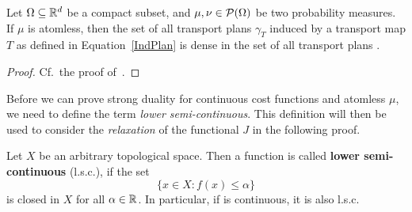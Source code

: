	


\begin{theorem}\label{IndPlansDense}
	Let $\Omega \subseteq \mathbb{R}^d$ be a compact subset, and $\mu, \nu \in \mathcal{P}(\Omega)$ be two probability measures. If $\mu$ is atomless, then the set of all transport plans $\gamma_T$ induced by a transport map $T$ as defined in Equation~\ref{IndPlan} is dense in the set of all transport plans \TP{\mu}{\nu}.
\end{theorem}

\begin{proof}
	Cf.~the proof of\ \cite[Theorem~1.32]{San2015}.
\end{proof}

Before we can prove strong duality for continuous cost functions and atomless $\mu$, we need to define the term \textit{lower semi-continuous}. This definition will then be used to consider the \textit{relaxation} of the functional $J$ in the following proof.

\begin{definition}\label{lsc}
	Let $X$ be an arbitrary topological space. Then a function  is called \textbf{lower semi-continuous} (l.s.c.), if the set
	\[ \big\{ x \in X : f(x) \le \alpha \big\} \]
	is closed in $X$ for all $\alpha \in \mathbb{R}$. In particular, if  is continuous, it is also l.s.c.
\end{definition}

